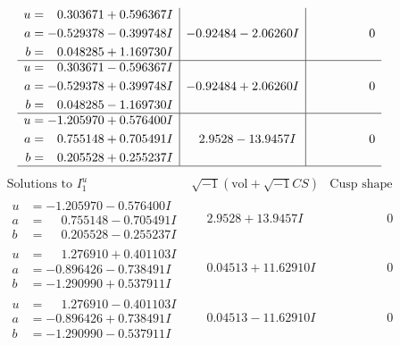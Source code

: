 \documentclass[1p]{elsarticle_modified}
\theoremstyle{definition}
\newcommand{\I}{\sqrt{-1}}
\begin{document}
$$\begin{array}{c|c|c}
\begin{aligned}
u &= \phantom{-}0.303671 + 0.596367 I \\
a &= -0.529378 - 0.399748 I \\
b &= \phantom{-}0.048285 + 1.169730 I\end{aligned}
 & -0.92484 - 2.06260 I & \phantom{-0.000000 } 0 \\ \hline\begin{aligned}
u &= \phantom{-}0.303671 - 0.596367 I \\
a &= -0.529378 + 0.399748 I \\
b &= \phantom{-}0.048285 - 1.169730 I\end{aligned}
 & -0.92484 + 2.06260 I & \phantom{-0.000000 } 0 \\ \hline\begin{aligned}
u &= -1.205970 + 0.576400 I \\
a &= \phantom{-}0.755148 + 0.705491 I \\
b &= \phantom{-}0.205528 + 0.255237 I\end{aligned}
 & \phantom{-}2.9528 - 13.9457 I & \phantom{-0.000000 } 0\\
 \hline 
 \end{array}$$\newpage$$\begin{array}{c|c|c}  
\text{Solutions to }I^u_{1}& \I (\text{vol} + \sqrt{-1}CS) & \text{Cusp shape}\\
 \hline 
\begin{aligned}
u &= -1.205970 - 0.576400 I \\
a &= \phantom{-}0.755148 - 0.705491 I \\
b &= \phantom{-}0.205528 - 0.255237 I\end{aligned}
 & \phantom{-}2.9528 + 13.9457 I & \phantom{-0.000000 } 0 \\ \hline\begin{aligned}
u &= \phantom{-}1.276910 + 0.401103 I \\
a &= -0.896426 - 0.738491 I \\
b &= -1.290990 + 0.537911 I\end{aligned}
 & \phantom{-}0.04513 + 11.62910 I & \phantom{-0.000000 } 0 \\ \hline\begin{aligned}
u &= \phantom{-}1.276910 - 0.401103 I \\
a &= -0.896426 + 0.738491 I \\
b &= -1.290990 - 0.537911 I\end{aligned}
 & \phantom{-}0.04513 - 11.62910 I & \phantom{-0.000000 } 0 \\ \hline\begin{aligned}

\end{aligned}
\end{array}$$
\end{document}
